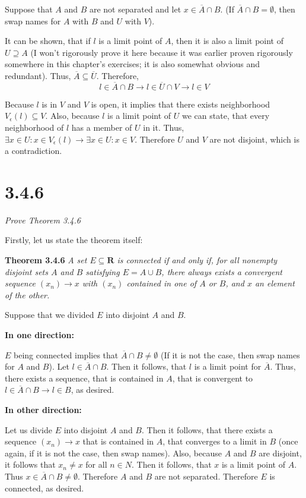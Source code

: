 \documentclass[11pt,oneside,titlepage]{article}
\begin{document}
Suppose that $A$ and $B$ are not separated and let $x \in \overline A \cap B$.
(If $\overline A \cap B = \emptyset$, then swap names for  $A$ with $B$ and
$U$ with $V$).

It can be shown, that if $l$ is a limit point of $A$, then it is also a limit
point of $U \supseteq A$ (I won't rigorously prove it here because it was
earlier proven rigorously somewhere in this chapter's exercises; it is
also somewhat obvious and redundant). Thus,
$\overline A \subseteq \overline U$. Therefore,
$$l \in \overline A \cap B \to l \in \overline U \cap V \to l \in V$$

Because $l$ is in $V$ and $V$ is open, it implies
that there exists neighborhood
$V_\epsilon(l) \subseteq V$. Also, because $l$ is a limit point of $U$ we
can state, that every neighborhood of $l$ has a member of $U$ in it.
Thus, $\exists x \in U: x \in V_\epsilon(l) \to
\exists x \in U: x \in V$. Therefore $U$ and $V$ are not disjoint, which is
a contradiction.

\section*{3.4.6}
\textit{Prove Theorem 3.4.6}

Firstly, let us state the theorem itself:

\textbf{Theorem 3.4.6}
\textit{A set $E \subseteq \textbf{R}$ is connected if and only if, for all
  nonempty disjoint sets $A$ and $B$ satisfying $E = A \cup B$, there always
  exists a convergent sequence $(x_n) \to x$ with $(x_n)$ contained in one of
  $A$ or $B$, and $x$ an element of the other.}

Suppose that we divided $E$ into disjoint $A$ and $B$.

\textbf{In one direction:}

$E$ being connected implies that $\overline A \cap B \neq \emptyset$ (If
it is not the case, then swap names for $A$ and $B$). Let
$l \in \overline A \cap B$. Then it follows, that $l$ is a limit point for
$\overline A$. Thus, there exists a sequence, that is contained in $A$,
that is convergent to $l \in \overline A \cap B \to l \in B$, as desired.

\textbf{In other direction:}

Let us divide $E$ into disjoint $A$ and $B$. Then it follows, that there
exists a sequence $(x_n) \to x$ that is contained in $A$, that converges to a
limit in $B$ (once again, if it is not the case, then swap names).
Also, because $A$ and $B$ are disjoint, it follows that $x_n \neq x$ for
all $n \in N$.
Then it follows, that $x$ is a limit point of $A$. Thus
$x \in \overline A \cap B \neq \emptyset$. Therefore $A$ and $B$ are not
separated. Therefore $E$ is connected, as desired.
\end{document}
